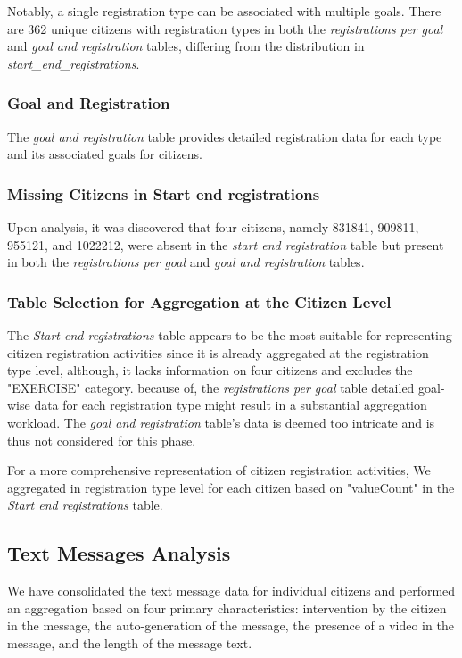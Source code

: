 \documentclass[12pt]{article}
\begin{document}
Notably, a single registration type can be associated with multiple goals. There are 362 unique citizens with registration types in both the \textit{registrations per goal} and \textit{goal and registration} tables, differing from the distribution in \textit{start\_end\_registrations}.

\subsubsection{Goal and Registration}
The \textit{goal and registration} table provides detailed registration data for each type and its associated goals for citizens.

\subsubsection{Missing Citizens in Start end registrations}
Upon analysis, it was discovered that four citizens, namely 831841, 909811, 955121, and 1022212, were absent in the \textit{start end registration} table but present in both the \textit{registrations per goal} and \textit{goal and registration} tables.

\subsubsection{Table Selection for Aggregation at the Citizen Level}
The \textit{Start end registrations} table appears to be the most suitable for representing citizen registration activities since it is already aggregated at the registration type level, although, it lacks information on four citizens and excludes the "EXERCISE" category. because of, the \textit{registrations per goal} table detailed goal-wise data for each registration type might result in a substantial aggregation workload. The \textit{goal and registration} table's data is deemed too intricate and is thus not considered for this phase.

For a more comprehensive representation of citizen registration activities, 
We aggregated in registration type level for each citizen based on "valueCount"  
in the \textit{Start end registrations} table.

\subsection{Text Messages Analysis}

We have consolidated the text message data for individual citizens and performed an aggregation based on four primary characteristics: intervention by the citizen in the message, the auto-generation of the message, the presence of a video in the message, and the length of the message text.
\end{document}
